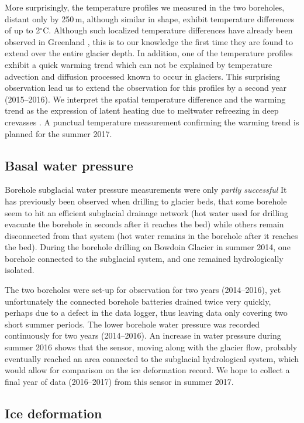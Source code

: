 \documentclass{article}
\newcommand{\unit}[1]{\ensuremath{\mathrm{#1}}}
\newcommand{\degree}[0]{\ensuremath{^{\circ}}}
\newcommand{\degC}[0]{\unit{{\degree}C}}
\begin{document}
More surprisingly, the temperature profiles we measured in the two boreholes,
distant only by 250\,m, although similar in shape, exhibit temperature
differences of up to 2\degC. Although such localized temperature differences
have already been observed in Greenland \citep{Luthi.etal.2015}, this is to our
knowledge the first time they are found to extend over the entire glacier
depth. In addition, one of the temperature profiles exhibit a quick warming
trend which can not be explained by temperature advection and diffusion
processed known to occur in glaciers. This surprising observation lead us to
extend the observation for this profiles by a second year (2015--2016). We
interpret the spatial temperature difference and the warming trend as the
expression of latent heating due to meltwater refreezing in deep crevasses
\citep{Seguinot.etal.Inprep}. A punctual temperature measurement confirming
the warming trend is planned for the summer 2017.


\subsection{Basal water pressure}

Borehole subglacial water pressure measurements were only \emph{partly
successful} It has previously been observed when drilling to glacier beds, that
some borehole seem to hit an efficient subglacial drainage network (hot water
used for drilling evacuate the borehole in seconds after it reaches the bed)
while others remain disconnected from that system (hot water remains in the
borehole after it reaches the bed). During the borehole drilling on Bowdoin
Glacier in summer 2014, one borehole connected to the subglacial system, and
one remained hydrologically isolated.

The two boreholes were set-up for observation for two years (2014--2016), yet
unfortunately the connected borehole batteries drained twice very quickly,
perhaps due to a defect in the data logger, thus leaving data only covering two
short summer periods. The lower borehole water pressure was recorded
continuously for two years (2014--2016). An increase in water pressure during
summer 2016 shows that the sensor, moving along with the glacier flow, probably
eventually reached an area connected to the subglacial hydrological system,
which would allow for comparison on the ice deformation record. We hope to
collect a final year of data (2016--2017) from this sensor in summer 2017.


\subsection{Ice deformation}
\end{document}
